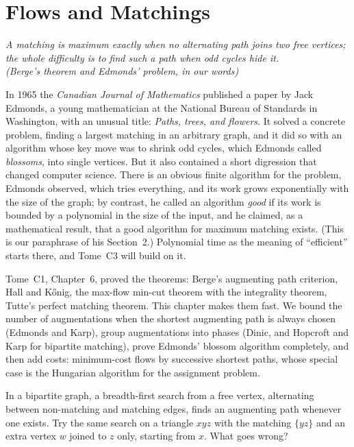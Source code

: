 \chapter{Flows and Matchings}\label{ch:flows}

\begin{center}\itshape
A matching is maximum exactly when no alternating path joins two free vertices;\\
the whole difficulty is to find such a path when odd cycles hide it.\\
\upshape(Berge's theorem and Edmonds' problem, in our words)
\end{center}

In 1965 the \emph{Canadian Journal of Mathematics} published a paper by Jack Edmonds, a young mathematician at the National Bureau of Standards in Washington,
with an unusual title: \emph{Paths, trees, and flowers}. It solved a concrete problem, finding a largest matching in an arbitrary graph, and it did so with
an algorithm whose key move was to shrink odd cycles, which Edmonds called \emph{blossoms}, into single vertices. But it also contained a short digression that
changed computer science. There is an obvious finite algorithm for the problem, Edmonds observed, which tries everything, and its work grows exponentially with the
size of the graph; by contrast, he called an algorithm \emph{good} if its work is bounded by a polynomial in the size of the input, and he claimed, as a mathematical
result, that a good algorithm for maximum matching exists. (This is our paraphrase of his Section~2.) Polynomial time as the meaning of ``efficient'' starts there, and Tome~C3
will build on it.

Tome~C1, Chapter~6, proved the theorems: Berge's augmenting path criterion, Hall and K\H onig, the max-flow min-cut theorem with the integrality theorem, Tutte's
perfect matching theorem. This chapter makes them fast. We bound the number of augmentations when the shortest augmenting path is always chosen (Edmonds and Karp), group
augmentations into phases (Dinic, and Hopcroft and Karp for bipartite matching), prove Edmonds' blossom algorithm completely, and then add costs: minimum-cost flows by successive
shortest paths, whose special case is the Hungarian algorithm for the assignment problem.

\begin{think}
In a bipartite graph, a breadth-first search from a free vertex, alternating between non-matching and matching edges, finds an augmenting path whenever one exists.
Try the same search on a triangle $xyz$ with the matching $\{yz\}$ and an extra vertex $w$ joined to $z$ only, starting from $x$. What goes wrong?
\end{think}

